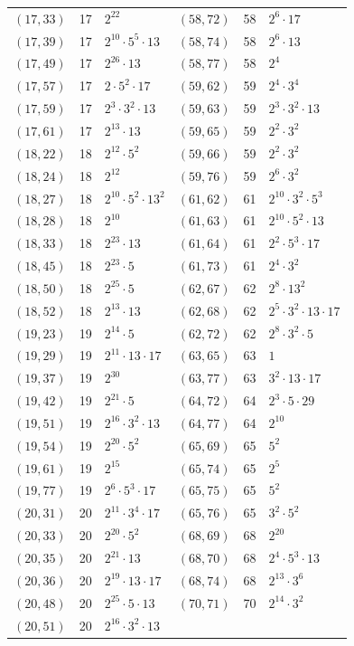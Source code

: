 \documentclass[11pt]{article}
\begin{document}
\begin{longtable}{@{}lrl@{\qquad}lrl@{}}
$(17,33)$ & 17 & $2^{22}$ & $(58,72)$ & 58 & $2^{6}\cdot 17$\\
$(17,39)$ & 17 & $2^{10}\cdot 5^{5}\cdot 13$ & $(58,74)$ & 58 & $2^{6}\cdot 13$\\
$(17,49)$ & 17 & $2^{26}\cdot 13$ & $(58,77)$ & 58 & $2^{4}$\\
$(17,57)$ & 17 & $2\cdot 5^{2}\cdot 17$ & $(59,62)$ & 59 & $2^{4}\cdot 3^{4}$\\
$(17,59)$ & 17 & $2^{3}\cdot 3^{2}\cdot 13$ & $(59,63)$ & 59 & $2^{3}\cdot 3^{2}\cdot 13$\\
$(17,61)$ & 17 & $2^{13}\cdot 13$ & $(59,65)$ & 59 & $2^{2}\cdot 3^{2}$\\
$(18,22)$ & 18 & $2^{12}\cdot 5^{2}$ & $(59,66)$ & 59 & $2^{2}\cdot 3^{2}$\\
$(18,24)$ & 18 & $2^{12}$ & $(59,76)$ & 59 & $2^{6}\cdot 3^{2}$\\
$(18,27)$ & 18 & $2^{10}\cdot 5^{2}\cdot 13^{2}$ & $(61,62)$ & 61 & $2^{10}\cdot 3^{2}\cdot 5^{3}$\\
$(18,28)$ & 18 & $2^{10}$ & $(61,63)$ & 61 & $2^{10}\cdot 5^{2}\cdot 13$\\
$(18,33)$ & 18 & $2^{23}\cdot 13$ & $(61,64)$ & 61 & $2^{2}\cdot 5^{3}\cdot 17$\\
$(18,45)$ & 18 & $2^{23}\cdot 5$ & $(61,73)$ & 61 & $2^{4}\cdot 3^{2}$\\
$(18,50)$ & 18 & $2^{25}\cdot 5$ & $(62,67)$ & 62 & $2^{8}\cdot 13^{2}$\\
$(18,52)$ & 18 & $2^{13}\cdot 13$ & $(62,68)$ & 62 & $2^{5}\cdot 3^{2}\cdot 13\cdot 17$\\
$(19,23)$ & 19 & $2^{14}\cdot 5$ & $(62,72)$ & 62 & $2^{8}\cdot 3^{2}\cdot 5$\\
$(19,29)$ & 19 & $2^{11}\cdot 13\cdot 17$ & $(63,65)$ & 63 & $1$\\
$(19,37)$ & 19 & $2^{30}$ & $(63,77)$ & 63 & $3^{2}\cdot 13\cdot 17$\\
$(19,42)$ & 19 & $2^{21}\cdot 5$ & $(64,72)$ & 64 & $2^{3}\cdot 5\cdot 29$\\
$(19,51)$ & 19 & $2^{16}\cdot 3^{2}\cdot 13$ & $(64,77)$ & 64 & $2^{10}$\\
$(19,54)$ & 19 & $2^{20}\cdot 5^{2}$ & $(65,69)$ & 65 & $5^{2}$\\
$(19,61)$ & 19 & $2^{15}$ & $(65,74)$ & 65 & $2^{5}$\\
$(19,77)$ & 19 & $2^{6}\cdot 5^{3}\cdot 17$ & $(65,75)$ & 65 & $5^{2}$\\
$(20,31)$ & 20 & $2^{11}\cdot 3^{4}\cdot 17$ & $(65,76)$ & 65 & $3^{2}\cdot 5^{2}$\\
$(20,33)$ & 20 & $2^{20}\cdot 5^{2}$ & $(68,69)$ & 68 & $2^{20}$\\
$(20,35)$ & 20 & $2^{21}\cdot 13$ & $(68,70)$ & 68 & $2^{4}\cdot 5^{3}\cdot 13$\\
$(20,36)$ & 20 & $2^{19}\cdot 13\cdot 17$ & $(68,74)$ & 68 & $2^{13}\cdot 3^{6}$\\
$(20,48)$ & 20 & $2^{25}\cdot 5\cdot 13$ & $(70,71)$ & 70 & $2^{14}\cdot 3^{2}$\\
$(20,51)$ & 20 & $2^{16}\cdot 3^{2}\cdot 13$ & & &\\
\end{longtable}
\endgroup
\end{document}
